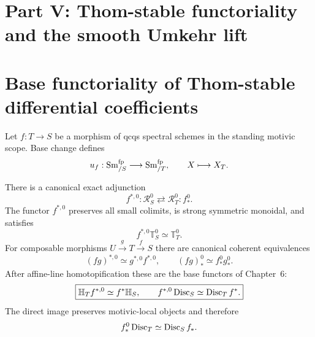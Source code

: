 \section*{Part V: Thom-stable functoriality and the smooth Umkehr lift}

\section{Base functoriality of Thom-stable differential coefficients}
\label{sec:bn-diff-thom-stable-base-functoriality}

Let \(f:T\to S\) be a morphism of qcqs spectral schemes in the standing
motivic scope.  Base change defines
\[
  u_f:\operatorname{Sm}^{\mathrm{fp}}_{/S}
  \longrightarrow
  \operatorname{Sm}^{\mathrm{fp}}_{/T},
  \qquad
  X\longmapsto X_T.
\]

\begin{theorem}
\label{thm:bn-diff-thom-stable-base-adjunction}
There is a canonical exact adjunction
\[
  \boxed{
  f^{*,0}:
  \mathcal R_S^0
  \rightleftarrows
  \mathcal R_T^0:
  f_*^0.
  }
\]
The functor \(f^{*,0}\) preserves all small colimits, is strong symmetric
monoidal, and satisfies
\[
  f^{*,0}\mathbb T_S^0\simeq\mathbb T_T^0.
\]
For composable morphisms \(U\xrightarrow{g}T\xrightarrow{f}S\) there are
canonical coherent equivalences
\[
  (fg)^{*,0}\simeq g^{*,0}f^{*,0},
  \qquad
  (fg)_*^0\simeq f_*^0g_*^0.
\]
After affine-line homotopification these are the base functors of Chapter~6:
\[
  \boxed{
  \mathbb H_Tf^{*,0}
  \simeq
  f^*\mathbb H_S,
  \qquad
  f^{*,0}\operatorname{Disc}_S
  \simeq
  \operatorname{Disc}_Tf^*.
  }
\]
The direct image preserves motivic-local objects and therefore
\[
  f_*^0\operatorname{Disc}_T\simeq\operatorname{Disc}_Sf_*.
\]
\end{theorem}


